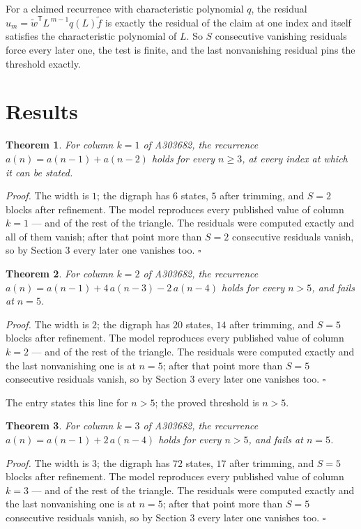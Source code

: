\documentclass[11pt]{article}
\newtheorem{theorem}{Theorem}
\theoremstyle{definition}
\begin{document}
For a claimed recurrence with characteristic polynomial $q$, the residual $u_m = \tilde w^{\mathsf T}L^{\,m-1}q(L)\tilde f$ is exactly the residual of the claim at one index and itself satisfies the characteristic polynomial of $L$. So $S$ consecutive vanishing residuals force every later one, the test is finite, and the last nonvanishing residual pins the threshold exactly.

\section{Results}

\begin{theorem} For column $k = 1$ of A303682, the recurrence $a(n) = a(n-1) + a(n-2)$ holds for every $n \ge 3$, at every index at which it can be stated.\end{theorem}

{\itshape Proof.} The width is $1$; the digraph has $6$ states, $5$ after trimming, and $S = 2$ blocks after refinement. The model reproduces every published value of column $k = 1$ --- and of the rest of the triangle. The residuals were computed exactly and all of them vanish; after that point more than $S = 2$ consecutive residuals vanish, so by Section 3 every later one vanishes too. $\square$

\begin{theorem} For column $k = 2$ of A303682, the recurrence $a(n) = a(n-1) + 4\,a(n-3) - 2\,a(n-4)$ holds for every $n > 5$, and fails at $n = 5$.\end{theorem}

{\itshape Proof.} The width is $2$; the digraph has $20$ states, $14$ after trimming, and $S = 5$ blocks after refinement. The model reproduces every published value of column $k = 2$ --- and of the rest of the triangle. The residuals were computed exactly and the last nonvanishing one is at $n = 5$; after that point more than $S = 5$ consecutive residuals vanish, so by Section 3 every later one vanishes too. $\square$

The entry states this line for $n > 5$; the proved threshold is $n > 5$.

\begin{theorem} For column $k = 3$ of A303682, the recurrence $a(n) = a(n-1) + 2\,a(n-4)$ holds for every $n > 5$, and fails at $n = 5$.\end{theorem}

{\itshape Proof.} The width is $3$; the digraph has $72$ states, $17$ after trimming, and $S = 5$ blocks after refinement. The model reproduces every published value of column $k = 3$ --- and of the rest of the triangle. The residuals were computed exactly and the last nonvanishing one is at $n = 5$; after that point more than $S = 5$ consecutive residuals vanish, so by Section 3 every later one vanishes too. $\square$
\end{document}
